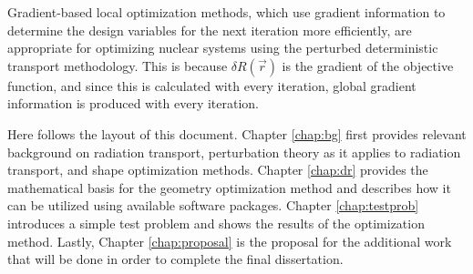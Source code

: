 Gradient-based local optimization methods, which use gradient information to determine the design variables for the next iteration more efficiently, are appropriate for optimizing nuclear systems using the perturbed deterministic transport methodology.
This is because $\delta R\left(\vec{r}\right)$ is the gradient of the objective function, and since this is calculated with every iteration, global gradient information is produced with every iteration.

Here follows the layout of this document.
Chapter \ref{chap:bg} first provides relevant background on radiation transport, perturbation theory as it applies to radiation transport, and shape optimization methods.
Chapter \ref{chap:dr} provides the mathematical basis for the geometry optimization method and describes how it can be utilized using available software packages.
Chapter \ref{chap:testprob} introduces a simple test problem and shows the results of the optimization method.
Lastly, Chapter \ref{chap:proposal} is the proposal for the additional work that will be done in order to complete the final dissertation.


